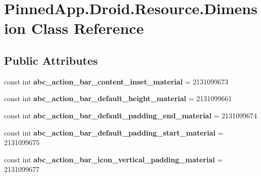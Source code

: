 \hypertarget{class_pinned_app_1_1_droid_1_1_resource_1_1_dimension}{}\section{Pinned\+App.\+Droid.\+Resource.\+Dimension Class Reference}
\label{class_pinned_app_1_1_droid_1_1_resource_1_1_dimension}
\subsection*{Public Attributes}
\begin{DoxyCompactItemize}
\item 
\mbox{\label{class_pinned_app_1_1_droid_1_1_resource_1_1_dimension_a12cd725b23e061deda00ae4d29a1392a}} 
const int {\bfseries abc\+\_\+action\+\_\+bar\+\_\+content\+\_\+inset\+\_\+material} = 2131099673
\item 
\mbox{\label{class_pinned_app_1_1_droid_1_1_resource_1_1_dimension_a3c0545cc84646dcd2080691bee619e51}} 
const int {\bfseries abc\+\_\+action\+\_\+bar\+\_\+default\+\_\+height\+\_\+material} = 2131099661
\item 
\mbox{\label{class_pinned_app_1_1_droid_1_1_resource_1_1_dimension_ae1b759dab30f4dbc17fc9b50529e6e7d}} 
const int {\bfseries abc\+\_\+action\+\_\+bar\+\_\+default\+\_\+padding\+\_\+end\+\_\+material} = 2131099674
\item 
\mbox{\label{class_pinned_app_1_1_droid_1_1_resource_1_1_dimension_a57843bbb701c010955c3d94a85b19c21}} 
const int {\bfseries abc\+\_\+action\+\_\+bar\+\_\+default\+\_\+padding\+\_\+start\+\_\+material} = 2131099675
\item 
\mbox{\label{class_pinned_app_1_1_droid_1_1_resource_1_1_dimension_a86c3468ca5a6ee3f240d128482889ae2}} 
const int {\bfseries abc\+\_\+action\+\_\+bar\+\_\+icon\+\_\+vertical\+\_\+padding\+\_\+material} = 2131099677
\item 
\mbox{\label{class_pinned_app_1_1_droid_1_1_resource_1_1_dimension_a27ccaec337636b0b779f2d901fe54cde}} 

\end{DoxyCompactItemize}
